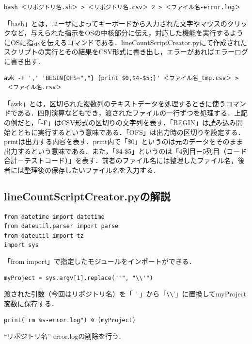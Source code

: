 \hfil
\begin{lstlisting}[basicstyle=\ttfamily\footnotesize, frame=single]
bash ＜リポジトリ名.sh＞ > ＜リポジトリ名.csv＞ 2 > ＜ファイル名-error.log＞
\end{lstlisting}
「bash」とは，ユーザによってキーボードから入力された文字やマウスのクリックなど，与えられた指示をOSの中核部分に伝え，対応した機能を実行するようにOSに指示を伝えるコマンドである．lineCountScriptCreator.pyにて作成されたスクリプトの実行とその結果をCSV形式に書き出し，エラーがあればエラーログに書き出す．

\hfil
\begin{lstlisting}[basicstyle=\ttfamily\footnotesize, frame=single]
awk -F ',' 'BEGIN{OFS=","} {print $0,$4-$5;}' ＜ファイル名_tmp.csv＞ >
 ＜ファイル名.csv＞
\end{lstlisting}
「awk」とは，区切られた複数列のテキストデータを処理するときに使うコマンドである．四則演算などもでき，渡されたファイルの一行ずつを処理する．上記の例だと，「-F」はCSV形式の区切りの文字列を表す．「BEGIN」は読み込み開始とともに実行するという意味である．「OFS」は出力時の区切りを設定する．printは出力する内容を表す．print内で「\$0」というのは元のデータをそのまま出力するという意味である．また，「\$4-\$5」というのは「4列目－5列目（コード合計－テストコード）」を表す．前者のファイル名には整理したファイル名，後者には整理後の保存したいファイル名を入力する．

\newpage

\subsection{lineCountScriptCreator.pyの解説}
\begin{lstlisting}[basicstyle=\ttfamily\footnotesize, frame=single]
from datetime import datetime
from dateutil.parser import parse
from dateutil import tz
import sys
\end{lstlisting}
「from import」で指定したモジュールをインポートができる．

\hfil
\begin{lstlisting}[basicstyle=\ttfamily\footnotesize, frame=single]
myProject = sys.argv[1].replace("'", "\\'")
\end{lstlisting}
渡された引数（今回はリポジトリ名）を「 ' 」から「\verb|\|\verb|\|'」に置換してmyProject変数に保存する．

\hfil
\begin{lstlisting}[basicstyle=\ttfamily\footnotesize, frame=single]
print("rm %s-error.log") % (myProject)
\end{lstlisting}
“リポジトリ名”-error.logの削除を行う．

